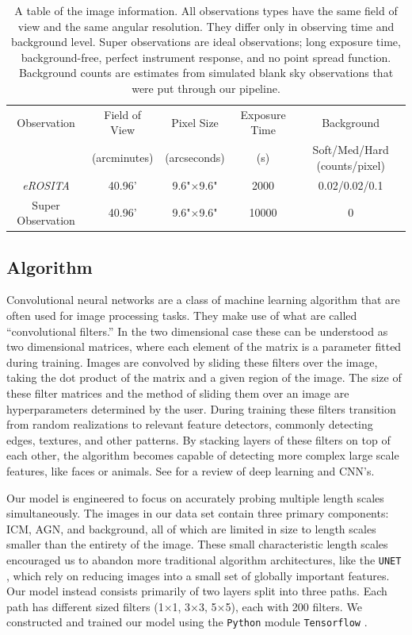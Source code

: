\documentclass[twocolumn, 11pt]{aastex63}%
\begin{document}
\begin{table}[h!]
\centering
 \begin{tabular}{||c| c c c c||} 
 \hline\hline
 Observation & Field of View & Pixel Size & Exposure Time & Background\\ [0.5ex]
  & (arcminutes) & (arcseconds) & (s)& Soft/Med/Hard
 (counts/pixel)\\ [0.5ex]
 \hline\hline
 \textit{eROSITA} &  40.96' & 9.6"$\times$9.6" & 2000& 0.02/0.02/0.1\\[1ex] 
 Super Observation &  40.96' & 9.6"$\times$9.6" & 10000& 0\\[1ex]
 \hline\hline
 \end{tabular}
 \caption{\label{tab:image_facts} A table of the image information. All observations types have the same field of view and the same angular resolution. They differ only in observing time and background level. Super observations are ideal observations; long exposure time, background-free, perfect instrument response, and no point spread function. Background counts are estimates from simulated blank sky observations that were put through our pipeline.}
\end{table}

\subsection{Algorithm}\label{algorithm}

Convolutional neural networks are a class of machine learning algorithm that are often used for image processing tasks.  They make use of what are called ``convolutional filters.'' In the two dimensional case these can be understood as two dimensional matrices, where each element of the matrix is a parameter fitted during training. Images are convolved by sliding these filters over the image, taking the dot product of the matrix and a given region of the image. The size of these filter matrices and the method of sliding them over an image are hyperparameters determined by the user. During training these filters transition from random realizations to relevant feature detectors, commonly detecting edges, textures, and other patterns. By stacking layers of these filters on top of each other, the algorithm becomes capable of detecting more complex large scale features, like faces or animals. See \citet{Lecun_2015} for a review of deep learning and CNN's.

Our model is engineered to focus on accurately probing multiple length scales simultaneously. The images in our data set contain three primary components: ICM, AGN, and background, all of which are limited in size to length scales smaller than the entirety of the image. These small characteristic length scales encouraged us to abandon more traditional algorithm architectures, like the \texttt{UNET} \citep{UNET}, which rely on reducing images into a small set of globally important features. Our model instead consists primarily of two layers split into three paths. Each path has different sized filters (1$\times$1, 3$\times$3, 5$\times$5), each with 200 filters. We constructed and trained our model using the \texttt{Python} \citep{Python3} module \texttt{Tensorflow} \citep{tensorflow2015-whitepaper}.
\end{document}
